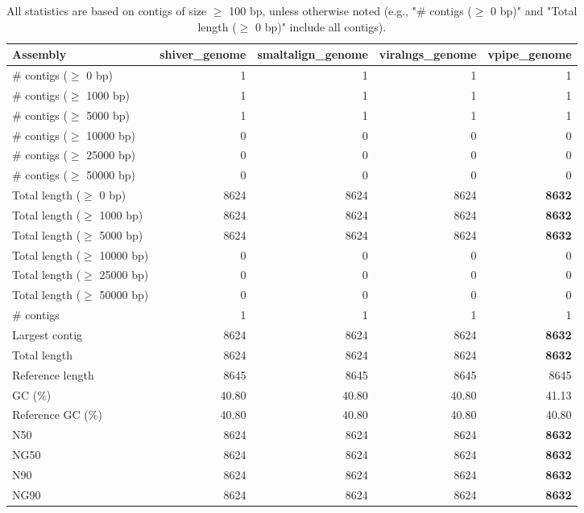 \documentclass[12pt,a4paper]{article}
\begin{document}
\begin{table}[ht]
\begin{center}
\caption{All statistics are based on contigs of size $\geq$ 100 bp, unless otherwise noted (e.g., "\# contigs ($\geq$ 0 bp)" and "Total length ($\geq$ 0 bp)" include all contigs).}
\begin{tabular}{|l*{4}{|r}|}
\hline
Assembly & shiver\_genome & smaltalign\_genome & viralngs\_genome & vpipe\_genome \\ \hline
\# contigs ($\geq$ 0 bp) & 1 & 1 & 1 & 1 \\ \hline
\# contigs ($\geq$ 1000 bp) & 1 & 1 & 1 & 1 \\ \hline
\# contigs ($\geq$ 5000 bp) & 1 & 1 & 1 & 1 \\ \hline
\# contigs ($\geq$ 10000 bp) & 0 & 0 & 0 & 0 \\ \hline
\# contigs ($\geq$ 25000 bp) & 0 & 0 & 0 & 0 \\ \hline
\# contigs ($\geq$ 50000 bp) & 0 & 0 & 0 & 0 \\ \hline
Total length ($\geq$ 0 bp) & 8624 & 8624 & 8624 & {\bf 8632} \\ \hline
Total length ($\geq$ 1000 bp) & 8624 & 8624 & 8624 & {\bf 8632} \\ \hline
Total length ($\geq$ 5000 bp) & 8624 & 8624 & 8624 & {\bf 8632} \\ \hline
Total length ($\geq$ 10000 bp) & 0 & 0 & 0 & 0 \\ \hline
Total length ($\geq$ 25000 bp) & 0 & 0 & 0 & 0 \\ \hline
Total length ($\geq$ 50000 bp) & 0 & 0 & 0 & 0 \\ \hline
\# contigs & 1 & 1 & 1 & 1 \\ \hline
Largest contig & 8624 & 8624 & 8624 & {\bf 8632} \\ \hline
Total length & 8624 & 8624 & 8624 & {\bf 8632} \\ \hline
Reference length & 8645 & 8645 & 8645 & 8645 \\ \hline
GC (\%) & 40.80 & 40.80 & 40.80 & 41.13 \\ \hline
Reference GC (\%) & 40.80 & 40.80 & 40.80 & 40.80 \\ \hline
N50 & 8624 & 8624 & 8624 & {\bf 8632} \\ \hline
NG50 & 8624 & 8624 & 8624 & {\bf 8632} \\ \hline
N90 & 8624 & 8624 & 8624 & {\bf 8632} \\ \hline
NG90 & 8624 & 8624 & 8624 & {\bf 8632} \\ \hline

\end{tabular}
\end{center}
\end{table}
\end{document}
